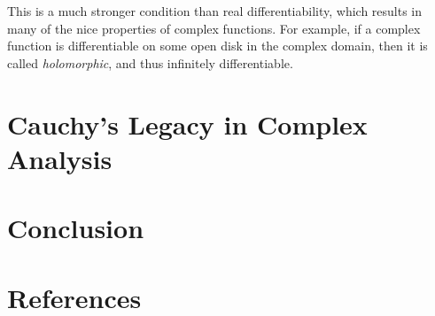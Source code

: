 \documentclass[12pt,letterpaper]{article}
\begin{document}
This is a much stronger condition than real differentiability, which results in many of the nice properties of complex functions.
For example, if a complex function is differentiable on some open disk in the complex domain, then it is called \textit{holomorphic}, and thus infinitely differentiable.

\section{Cauchy's Legacy in Complex Analysis}

\section{Conclusion}

\section{References}
\printbibliography

\end{document}
